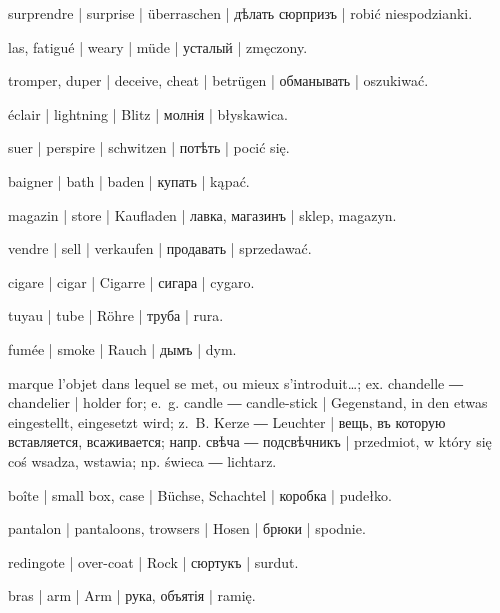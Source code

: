 \begin{ekzvocab}{1em}
 surprendre | surprise | überraschen | дѣлать сюрпризъ | robić niespodzianki.

 las, fatigué | weary | müde | усталый | zmęczony.

 tromper, duper | deceive, cheat | betrügen | обманывать | oszukiwać.

 éclair | lightning | Blitz | молнія | błyskawica.

 suer | perspire | schwitzen | потѣть | pocić się.

 baigner | bath | baden | купать | kąpać.

 magazin | store | Kaufladen | лавка, магазинъ | sklep, magazyn.

 vendre | sell | verkaufen | продавать | sprzedawać.

 cigare | cigar | Cigarre | сигара | cygaro.

 tuyau | tube | Röhre | труба | rura.

 fumée | smoke | Rauch | дымъ | dym.

 marque l’objet dans lequel se met, ou mieux s’introduit\ldots{}; ex.  chandelle ―  chandelier | holder for; e.~g.  candle ―  candle-stick | Gegenstand, in den etwas eingestellt, eingesetzt wird; z.~B.  Kerze ―  Leuchter | вещь, въ которую вставляется, всаживается; напр.  свѣча ―  подсвѣчникъ | przedmiot, w który się coś wsadza, wstawia; np.  świeca ―  lichtarz.

 boîte | small box, case | Büchse, Schachtel | коробка | pudełko.

 pantalon | pantaloons, trowsers | Hosen | брюки | spodnie.

 redingote | over-coat | Rock | сюртукъ | surdut.

 bras | arm | Arm | рука, объятія | ramię.

\end{ekzvocab}



